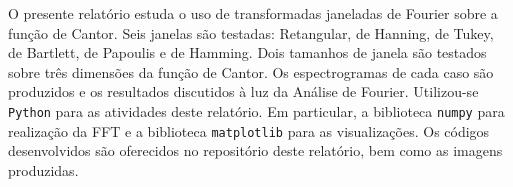 
\begin{resumo}


\hypertarget{estilo:resumo}{} %

O presente relatório estuda o uso de transformadas janeladas de Fourier sobre a função de Cantor. Seis janelas são testadas: Retangular, de Hanning, de Tukey, de Bartlett, de Papoulis e de Hamming. Dois tamanhos de janela são testados sobre três dimensões da função de Cantor. Os espectrogramas de cada caso são produzidos e os resultados discutidos à luz da Análise de Fourier. Utilizou-se \texttt{Python} para as atividades deste relatório. Em particular, a biblioteca \texttt{numpy} para realização da FFT e a biblioteca \texttt{matplotlib} para as visualizações. Os códigos desenvolvidos são oferecidos no repositório deste relatório, bem como as imagens produzidas.


 
\end{resumo}